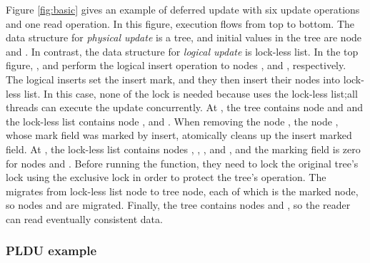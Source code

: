 Figure \ref{fig:basic} gives an example of deferred update with six update
operations and one read operation.
In this figure, execution flows from top to bottom.
The data structure for \emph{physical update} is a tree, and initial values in
the tree are node  and .
In contrast, the data structure for \emph{logical update} is lock-less list.
In the top figure, ,  and  perform the
logical insert operation to nodes ,  and ,
 respectively.
The logical inserts set the insert mark, and they then insert their
nodes into lock-less list.
In this case, none of the lock is needed because  uses the lock-less
list;all threads can execute the update concurrently.
At , the tree contains node 
and  and 
the lock-less list contains node ,  and .
When removing the node , the node , whose mark field was marked
by insert, atomically cleans up the insert marked field.
At , the lock-less list contains nodes
, , , and , and the marking field is zero for 
nodes  and .
Before running the  function, they need to lock the original
 tree's lock using the exclusive lock in order to protect the tree's
 operation.
The  migrates from lock-less list node to tree node, each of 
which is the marked node, so nodes  and  are migrated.
Finally, the tree contains nodes  and , so the reader can read
 eventually consistent data.



\subsubsection{PLDU example}
%

